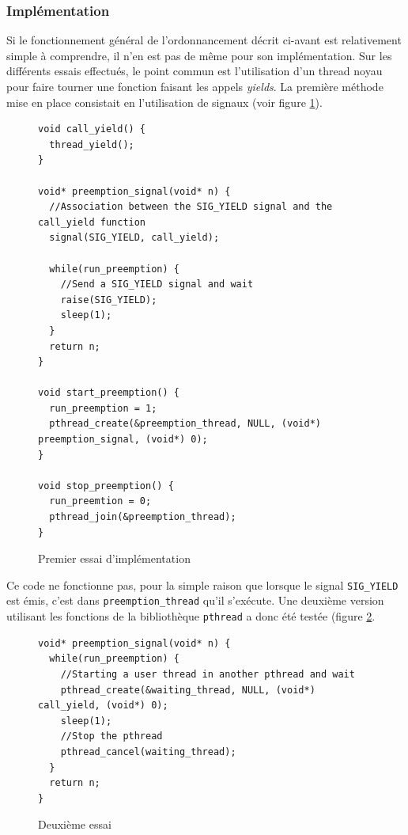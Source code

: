 \documentclass[a4paper,11pt]{article}
\begin{document}
\subsubsection*{Implémentation}

Si le fonctionnement général de l'ordonnancement décrit ci-avant est relativement simple à comprendre, il n'en est pas de même pour son implémentation. Sur les différents essais effectués, le point commun est l'utilisation d'un thread noyau pour faire tourner une fonction faisant les appels \textit{yields}. La première méthode mise en place consistait en l'utilisation de signaux (voir figure \ref{codepreemption1}).

\begin{figure}[H]
\begin{lstlisting}
void call_yield() {
  thread_yield();
}

void* preemption_signal(void* n) {
  //Association between the SIG_YIELD signal and the call_yield function
  signal(SIG_YIELD, call_yield);

  while(run_preemption) {
    //Send a SIG_YIELD signal and wait
    raise(SIG_YIELD);
    sleep(1);
  }
  return n;
}

void start_preemption() {
  run_preemption = 1;
  pthread_create(&preemption_thread, NULL, (void*) preemption_signal, (void*) 0);
}

void stop_preemption() {
  run_preemtion = 0;
  pthread_join(&preemption_thread);
}
\end{lstlisting}
\caption{Premier essai d'implémentation}
\label{codepreemption1}
\end{figure}

Ce code ne fonctionne pas, pour la simple raison que lorsque le signal \texttt{SIG\_YIELD} est émis, c'est dans \texttt{preemption\_thread} qu'il s'exécute. Une deuxième version utilisant les fonctions de la bibliothèque \texttt{pthread} a donc été testée (figure \ref{codepreemption2}.

\begin{figure}[H]
\begin{lstlisting}
void* preemption_signal(void* n) {
  while(run_preemption) {
    //Starting a user thread in another pthread and wait
    pthread_create(&waiting_thread, NULL, (void*) call_yield, (void*) 0);
    sleep(1);
    //Stop the pthread
    pthread_cancel(waiting_thread);
  }
  return n;
}
\end{lstlisting}
\caption{Deuxième essai}
\label{codepreemption2}
\end{figure}
\end{document}
